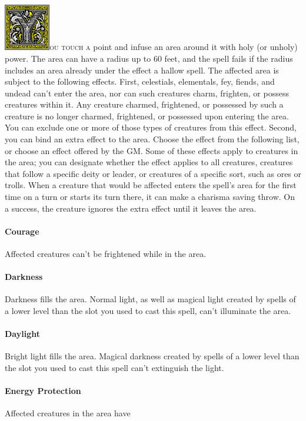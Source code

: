 \documentclass[12pt,showtrims]{memoir}
\begin{document}
\enlargethispage{1\baselineskip}
\vspace{1\baselineskip}\noindent
\lettrine[lines=4]{\includegraphics[height=58pt]{initials/Y.png}}{ou touch a} point and infuse an area around it with holy (or unholy) power. The area can have a radius up to 60 feet, and the spell fails if the radius includes an area already under the effect a hallow spell. The affected area is subject to the following effects. First, celestials, elementals, fey, fiends, and undead can't enter the area, nor can such creatures charm, frighten, or possess creatures within it. Any creature charmed, frightened, or possessed by such a creature is no longer charmed, frightened, or possessed upon entering the area. You can exclude one or more of those types of creatures from this effect. Second, you can bind an extra effect to the area. Choose the effect from the following list, or choose an effect offered by the GM. Some of these effects apply to creatures in the area; you can designate whether the effect applies to all creatures, creatures that follow a specific deity or leader, or creatures of a specific sort, such as ores or trolls. When a creature that would be affected enters the spell's area for the first time on a turn or starts its turn there, it can make a charisma saving throw. On a success, the creature ignores the extra effect until it leaves the area. \paragraph{Courage} Affected creatures can't be frightened while in the area. \paragraph{Darkness} Darkness fills the area. Normal light, as well as magical light created by spells of a lower level than the slot you used to cast this spell, can't illuminate the area. \paragraph{Daylight} Bright light fills the area. Magical darkness created by spells of a lower level than the slot you used to cast this spell can't extinguish the light. \paragraph{Energy Protection} Affected creatures in the area have 
\end{document}
